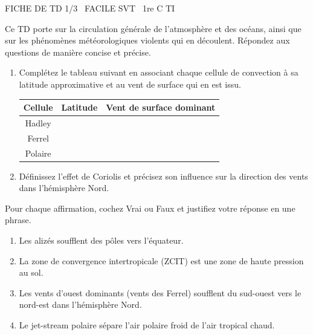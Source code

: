 \documentclass[11pt]{article}
\begin{document}
\begin{tcolorbox}[enhanced,colback=popink,colframe=popink,arc=10pt,boxrule=0pt,left=12pt,right=12pt,top=9pt,bottom=9pt]
{\color{white}\popxbold\small FICHE DE TD 1/3 \textbullet\ FACILE \hfill SVT \textbullet\ 1re C TI\par}
\end{tcolorbox}
\vspace{4pt}
\noindent Ce TD porte sur la circulation générale de l'atmosphère et des océans, ainsi que sur les phénomènes météorologiques violents qui en découlent. Répondez aux questions de manière concise et précise.

\begin{exercice}
\begin{enumerate}
    \item Complétez le tableau suivant en associant chaque cellule de convection à sa latitude approximative et au vent de surface qui en est issu.
    \begin{tabular}{|c|c|c|}
    \hline
    \textbf{Cellule} & \textbf{Latitude} & \textbf{Vent de surface dominant} \\
    \hline
    Hadley &  &  \\
    \hline
    Ferrel &  &  \\
    \hline
    Polaire &  &  \\
    \hline
    \end{tabular}
    \item Définissez l'effet de Coriolis et précisez son influence sur la direction des vents dans l'hémisphère Nord.
\end{enumerate}
\end{exercice}

\begin{exercice}
Pour chaque affirmation, cochez Vrai ou Faux et justifiez votre réponse en une phrase.
\begin{enumerate}
    \item Les alizés soufflent des pôles vers l'équateur.
    \item La zone de convergence intertropicale (ZCIT) est une zone de haute pression au sol.
    \item Les vents d'ouest dominants (vents des Ferrel) soufflent du sud-ouest vers le nord-est dans l'hémisphère Nord.
    \item Le jet-stream polaire sépare l'air polaire froid de l'air tropical chaud.
\end{enumerate}
\end{exercice}
\end{document}

